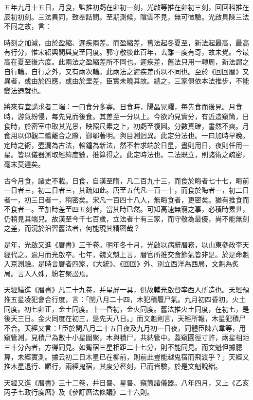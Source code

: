 五年九月十五日，月食，監推初虧在卯初一刻，光啟等推在卯初三刻，回回科推在辰初初刻。三法異同，致奉詰問。至期測候，陰雲不見，無可徵驗。光啟具陳三法不同之故，言：

時刻之加減，由於盈縮、遲疾兩差。而盈縮差，舊法起冬夏至，新法起最高，最高有行分，惟宋紹興間與夏至同度。郭守敬後此百年，去離一度有奇，故未覺。今最高在夏至後六度。此兩法之盈縮差所不同也。遲疾差，舊法只用一轉周，新法謂之自行輪。自行之外，又有兩次輪。此兩法之遲疾差所以不同也。至於《回回曆》又異者，或由於四應，或由於里差，臣實未曉其故。總之，三家俱依本法推步，不能變法遷就也。

將來有宜講求者二端：一曰食分多寡。日食時，陽晶晃耀，每先食而後見。月食時，游氣紛侵，每先見而後食。其差至一分以上。今欲灼見實分，有近造窺筒，日食時，於密室中取其光景，映照尺素之上，初虧至復圓。分數真確，書然不爽。月食用以仰觀二體離合之際，鄞鄂著明。與目測迥異。此定分法也。一曰加時早晚。定時之術，壺漏為古法，輪鐘為新法，然不若求端於日星，晝則用日，夜則任用一星。皆以儀器測取經緯度數，推算得之。此定時法也。二法既立，則諸術之疏密，毫末莫遁矣。

古今月食，諸史不載。日食，自漢至隋，凡二百九十三，而食於晦者七十七，晦前一日者三，初二日者三，其疏如此。唐至五代凡一百一十，而食於晦者一，初二日者一，初三日者一，稍密矣。宋凡一百四十八人，無晦食者，更密矣。猶有推食而不食者一。至加時差至四五刻者，當其時已然。可知高速無窮之事，必積時累世，仍稍見其端兒。故漢至今千七百歲，立法者十有三家，而守敬為最優，尚不能無刻之差，而況於沿習舊法者，何能現其精密哉？

是年，光啟又進《曆書》三千卷。明年冬十月，光啟以病辭曆務，以山東參政李天經代之。逾月而光啟卒。七年，魏文魁上言，曆官所推交食節氣皆非是。於是命魁入京測驗。是時言曆者四家，《大統》、《回回》外、別立西洋為西局，文魁為炙局。言人人殊，紛若聚訟焉。

天經繕進《曆書》凡二十九卷，并星屏一具，俱故輔光啟督率西人所造也。天經預推五星凌犯會合行度，言：「閏八月二十四，木犯積履尸氣。九月初四昏初，火土同度。初七卯正，金土同度。十一昏初，金火同度。舊法推火土同度，在初七，是後天三日。金火同度在初三，是先天八日。」而文魁則言，天經所報，木星犯積尸不合。天經又言：「臣於閏八月二十五日夜及九月初一日夜，同體臣陳六韋等，用窺管測，見積尸為數十小星圍聚，木與積尸，共納管中。蓋窺圓徑寸許，兩星相距三十分內者，方得同見。如觜宿三星相距二十七分，則不能同見。而文魁但據臆算，未經實測。據云初二日木星已在柳前，則前此豈能越鬼宿而飛渡乎？」天經又推木星退行、順行，兩經鬼宿，其度分晷刻，已而皆驗，於是文魁說絀。

天經又進《曆書》三十二卷，并日晷、星晷、窺筒諸儀器。八年四月，又上《乙亥丙子七政行度曆》及《參訂曆法條議》二十六則。

